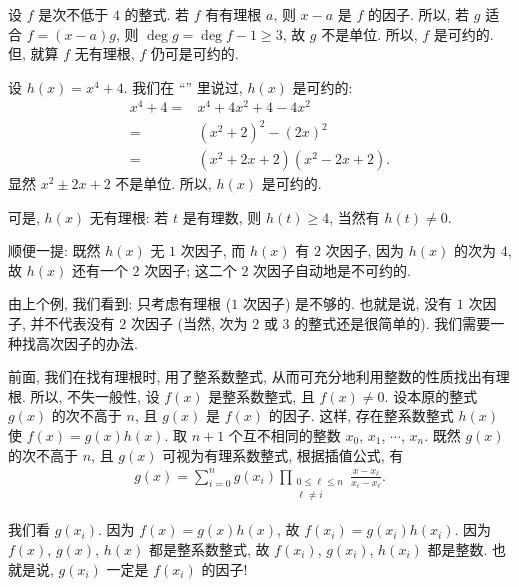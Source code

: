 设 $f$ 是次不低于 $4$ 的整式. 若 $f$ 有有理根 $a$, 则 $x-a$ 是 $f$ 的因子. 所以, 若 $g$ 适合 $f = (x-a)g$, 则 $\deg g = \deg f - 1 \geq 3$, 故 $g$ 不是单位. 所以, $f$ 是可约的. 但, 就算 $f$ 无有理根, $f$ 仍可是可约的.

\begin{example}
    设 $h(x) = x^4 + 4$. 我们在 ``\PolynomialsOverZAndOverQ '' 里说过, $h(x)$ 是可约的:
    \begin{align*}
        x^4 + 4
        = {} & x^4 + 4x^2 + 4 - 4x^2          \\
        = {} & (x^2 + 2)^2 - (2x)^2           \\
        = {} & (x^2 + 2x + 2) (x^2 - 2x + 2).
    \end{align*}
    显然 $x^2 \pm 2x + 2$ 不是单位. 所以, $h(x)$ 是可约的.

    可是, $h(x)$ 无有理根: 若 $t$ 是有理数, 则 $h(t) \geq 4$, 当然有 $h(t) \neq 0$.

    顺便一提: 既然 $h(x)$ 无 $1$ 次因子, 而 $h(x)$ 有 $2$ 次因子, 因为 $h(x)$ 的次为 $4$, 故 $h(x)$ 还有一个 $2$ 次因子; 这二个 $2$ 次因子自动地是不可约的.
\end{example}

由上个例, 我们看到: 只考虑有理根 ($1$ 次因子) 是不够的. 也就是说, 没有 $1$ 次因子, 并不代表没有 $2$ 次因子 (当然, 次为 $2$ 或 $3$ 的整式还是很简单的). 我们需要一种找高次因子的办法.

前面, 我们在找有理根时, 用了整系数整式, 从而可充分地利用整数的性质找出有理根. 所以, 不失一般性, 设 $f(x)$ 是整系数整式, 且 $f(x) \neq 0$. 设本原的整式 $g(x)$ 的次不高于 $n$, 且 $g(x)$ 是 $f(x)$ 的因子. 这样, 存在整系数整式 $h(x)$ 使 $f(x) = g(x) h(x)$. 取 $n+1$ 个互不相同的整数 $x_0$, $x_1$, $\cdots$, $x_n$. 既然 $g(x)$ 的次不高于 $n$, 且 $g(x)$ 可视为有理系数整式, 根据插值公式, 有
\begin{align*}
    g(x) = \sum_{i = 0}^{n} g(x_i) \prod_{\begin{smallmatrix}0 \leq \ell \leq n \\\ell \neq i\end{smallmatrix}} \frac{x - x_\ell}{x_i - x_\ell}. \tag*{(L)}
\end{align*}

我们看 $g(x_i)$. 因为 $f(x) = g(x) h(x)$, 故 $f(x_i) = g(x_i) h(x_i)$. 因为 $f(x)$, $g(x)$, $h(x)$ 都是整系数整式, 故 $f(x_i)$, $g(x_i)$, $h(x_i)$ 都是整数. 也就是说, $g(x_i)$ 一定是 $f(x_i)$ 的因子!

